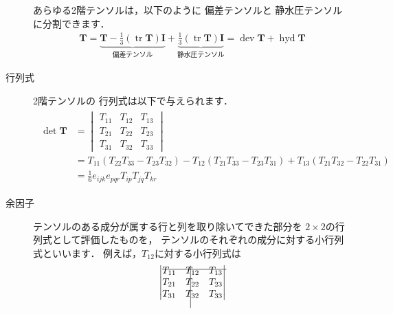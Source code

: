 \begin{description}
            あらゆる2階テンソルは，以下のように
%
            偏差テンソルと
%
            静水圧テンソルに分割できます．
            \begin{align}
             \label{eq:1.34}
             \bm{T} = \underbrace{\bm{T}
             - \frac{1}{3}(\mathop{\mathrm{tr}}\bm{T})\bm{I}}_{\text{偏差テンソル}}
             + \underbrace{\frac{1}{3}(\mathop{\mathrm{tr}}\bm{T})\bm{I}}_{\text{静水圧テンソル}}
             = \mathop{\mathrm{dev}}\bm{T} + \mathop{\mathrm{hyd}}\bm{T}
            \end{align}
 \item[行列式] 2階テンソルの
%
            行列式は以下で与えられます．
            \begin{align}
             \label{eq:1.35}
             \begin{split}
              \det\bm{T} &= \begin{vmatrix}
                             T_{11} & T_{12} & T_{13} \\
                             T_{21} & T_{22} & T_{23} \\
                             T_{31} & T_{32} & T_{33}
                            \end{vmatrix} \\
              &= T_{11}(T_{22}T_{33} - T_{23}T_{32})
              - T_{12}(T_{21}T_{33} - T_{23}T_{31})
              + T_{13}(T_{21}T_{32} - T_{22}T_{31}) \\
              &= \frac{1}{6}e_{ijk}e_{pqr}T_{ip}T_{jq}T_{kr}
             \end{split}
            \end{align}
 \item[余因子] テンソルのある成分が属する行と列を取り除いてできた部分を
            $2 \times 2$の行列式として評価したものを，
            テンソルのそれぞれの成分に対する小行列式といいます．
            例えば，$T_{12}$に対する小行列式は
            \begin{align}
             \label{eq:1.36}
             \begin{vmatrix}
              \rlap{\rule[4pt]{67pt}{.4pt}}T_{11} &
              \rlap{\hskip5pt\smash{\rule[-36pt]{.4pt}{44pt}}}T_{12} & T_{13} \\
              T_{21} & T_{22} & T_{23} \\
              T_{31} & T_{32} & T_{33}
             \end{vmatrix}

\end{align}
\end{description}
